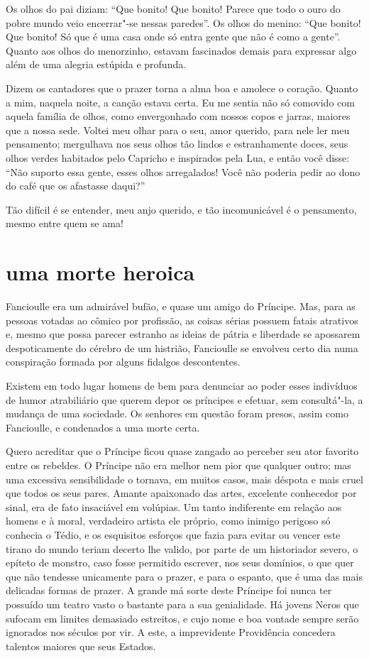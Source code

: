 Os olhos do pai diziam: ``Que bonito! Que bonito!
Parece que todo o ouro do pobre mundo veio encerrar"-se nessas
paredes''. Os olhos do menino: ``Que
bonito! Que bonito! Só que é uma casa onde só entra gente que não
é como a gente''. Quanto aos olhos do menorzinho, estavam
fascinados demais para expressar algo além de uma alegria estúpida e
profunda.

Dizem os cantadores que o prazer torna a alma boa e amolece o coração. Quanto a mim, naquela noite, a canção estava certa. Eu
me sentia não só comovido com aquela família de olhos, como envergonhado
com nossos copos e jarras, maiores que a nossa sede. Voltei meu
olhar para o seu, amor querido, para nele ler meu pensamento;
mergulhava nos seus olhos tão lindos e estranhamente doces, 
seus olhos verdes habitados pelo Capricho e inspirados pela Lua, e então
você disse: ``Não suporto essa gente, esses
olhos arregalados! Você não poderia pedir ao dono do café que os
afastasse daqui?''

\quebra

Tão difícil é se entender, meu anjo querido, e tão incomunicável é o
pensamento, mesmo entre quem se ama!

\quebra\section[Uma morte heroica]{uma morte heroica}

Fancioulle era um admirável bufão, e quase um amigo do Príncipe. Mas,
para as pessoas votadas ao cômico por profissão, as coisas sérias possuem
fatais atrativos e, mesmo que possa parecer estranho as ideias de
pátria e liberdade se apossarem despoticamente do cérebro de um
histrião, Fancioulle se envolveu certo dia numa conspiração formada por alguns
fidalgos descontentes.

Existem em todo lugar homens de bem para denunciar ao poder esses
indivíduos de humor atrabiliário que querem depor os príncipes e
efetuar, sem consultá"-la, a mudança de uma sociedade. Os senhores em
questão foram presos, assim como Fancioulle, e condenados a uma morte
certa.

Quero acreditar que o Príncipe ficou quase zangado ao
perceber seu ator favorito entre os rebeldes. O Príncipe não era
melhor nem pior que qualquer outro; mas uma excessiva sensibilidade o tornava,
em muitos casos, mais déspota e mais cruel que todos os seus pares.
Amante apaixonado das artes, excelente conhecedor por sinal, era de fato
insaciável em volúpias. Um tanto indiferente em relação aos homens e à
moral, verdadeiro artista ele próprio, como inimigo perigoso só conhecia
o Tédio, e os esquisitos esforços que fazia para evitar ou
vencer este tirano do mundo teriam decerto lhe valido, por parte de
um historiador severo, o epíteto de
monstro, caso fosse permitido escrever, nos seus
domínios, o que quer que não tendesse unicamente
para o prazer, e para o espanto, que é uma das mais delicadas formas de
prazer. A grande má sorte deste Príncipe foi nunca ter possuído
um teatro vasto o bastante para a sua genialidade. Há jovens Neros que
sufocam em limites demasiado estreitos, e cujo nome e boa vontade sempre serão ignorados nos séculos por vir. A este, a imprevidente
Providência concedera talentos maiores que seus Estados.

